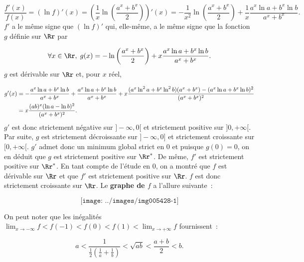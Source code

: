 {{$$\frac{f'(x)}{f(x)}=(\ln f)'(x)=\left(\frac{1}{x}\ln\left(\frac{a^x+b^x}{2}\right)\right)'(x)=-\frac{1}{x^2}\ln\left(\frac{a^x+b^x}{2}\right)+\frac{1}{x}
\frac{a^x\ln a+b^x\ln b}{a^x+b^x}.$$
$f'$ a le même signe que $(\ln f)'$ qui, elle-même, a le même signe que la fonction $g$ définie sur $\Rr$ par

$$\forall x\in\Rr,\;g(x)=-\ln\left(\frac{a^x+b^x}{2}\right)+x\frac{a^x\ln a+b^x\ln b}{a^x+b^x}.$$
$g$ est dérivable sur $\Rr$ et, pour $x$ réel,

\begin{align*}\ensuremath
g'(x)&=-\frac{a^x\ln a+b^x\ln b}{a^x+b^x}+\frac{a^x\ln a+b^x\ln b}{a^x+b^x}+x\frac{(a^x\ln^2a+b^x\ln^2b)(a^x+b^x)-(a^x\ln a+b^x\ln b)^2}{(a^x+b^x)^2}\\
 &=x\frac{(ab)^x(\ln a-\ln b)^2}{(a^x+b^x)^2}.
\end{align*}
$g'$ est donc strictement négative sur $]-\infty,0[$ et strictement positive sur $]0,+\infty[$. Par suite, $g$ est strictement décroissante sur $]-\infty,0]$ et strictement croissante sur $[0,+\infty[$. $g'$ admet donc un minimum global strict en $0$ et puisque $g(0)=0$, on en déduit que $g$ est strictement positive sur $\Rr^*$. De même, $f'$ est strictement positive sur $\Rr^*$. En tant compte de l'étude en $0$, on a montré que $f$ est dérivable sur $\Rr$ et que $f'$ est strictement positive sur $\Rr$. $f$ est donc strictement croissante sur $\Rr$.
Le \textbf{graphe de $f$} a l'allure suivante~:

$$\texttt{[image: ../images/img005428-1]}$$

On peut noter que les inégalités $\lim_{x\rightarrow -\infty}f<f(-1)<f(0)<f(1)<\lim_{x\rightarrow +\infty}f$ fournissent~:

$$a<\frac{1}{\frac{1}{2}(\frac{1}{a}+\frac{1}{b})}<\sqrt{ab}<\frac{a+b}{2}<b.$$
}
}
